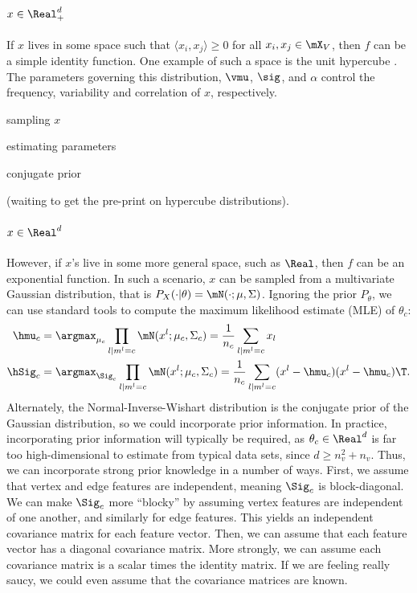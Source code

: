 \paragraph{$x \in \Real^d_+$}

If $x$ lives in some space such that $\langle x_i, x_j \rangle \geq 0$ for all $x_i, x_j \in \mX_V$, then $f$ can be a simple identity function.  One example of such a space is the unit hypercube \cite{?}. The parameters governing this distribution, $\vmu$, $\sig$, and $\alpha$ control the frequency, variability and correlation of $x$, respectively. 

sampling $x$

estimating parameters

conjugate prior

(waiting to get the pre-print on hypercube distributions).  

\paragraph{$x \in \Real^d$}

However, if $x$'s live in some more general space, such as $\Real$, then $f$ can be an exponential function.  In such a scenario, $x$ can be sampled from a multivariate Gaussian distribution, that is $P_X( \cdot | \theta)=\mN(\cdot; \mu,\Sigma)$.  Ignoring the prior $P_{\theta}$, we can use standard tools to compute the maximum likelihood estimate (MLE) of $\theta_c$:
\begin{align}
	\hmu_c &= \argmax_{\mu_c} \prod_{l | m^l= c} \mN(x^l; \mu_c, \Sigma_c) = \frac{1}{n_c} \sum_{l | m^l = c} x_l \\
	\hSig_c &= \argmax_{\Sig_c} \prod_{l | m^l= c} \mN(x^l; \mu_c, \Sigma_c) =\frac{1}{n_c} \sum_{l | m^l=c} (x^l - \hmu_c) (x^l -\hmu_c)\T.
\end{align}
Alternately, the Normal-Inverse-Wishart distribution is the conjugate prior of the Gaussian distribution, so we could incorporate prior information. In practice, incorporating prior information will typically be required, as $\theta_c \in \Real^d$ is far too high-dimensional to estimate from typical data sets, since $d \geq n_v^2+n_v$.  Thus, we can incorporate strong prior knowledge in a number of ways.  First, we assume that vertex and edge features are independent, meaning $\Sig_c$ is block-diagonal.  We can make $\Sig_c$ more ``blocky'' by assuming vertex features are independent of one another, and similarly for edge features.  This yields an independent covariance matrix for each feature vector.  Then, we can assume that each feature vector has a diagonal covariance matrix. More strongly, we can assume each covariance matrix is a scalar times the identity matrix.  If we are feeling really saucy, we could even assume that the covariance matrices are known.  

